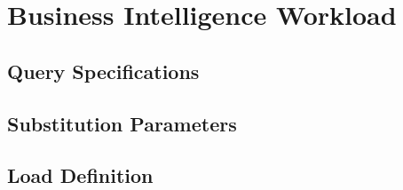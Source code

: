 \chapter{Business Intelligence Workload}

\section{Query Specifications}

\clearpage



























\section{Substitution Parameters}


\section{Load Definition}

